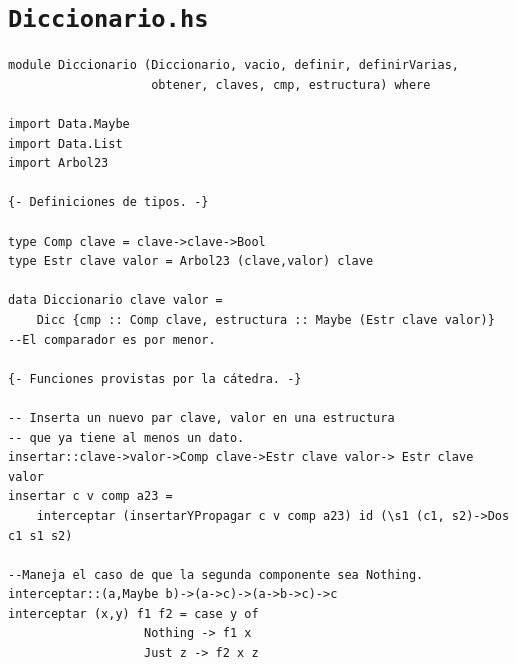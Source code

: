 \documentclass[a4paper]{article}
\begin{document}
\section{\texttt{Diccionario.hs}}
\begin{verbatim}
module Diccionario (Diccionario, vacio, definir, definirVarias,
                    obtener, claves, cmp, estructura) where

import Data.Maybe
import Data.List
import Arbol23

{- Definiciones de tipos. -}

type Comp clave = clave->clave->Bool
type Estr clave valor = Arbol23 (clave,valor) clave

data Diccionario clave valor =
    Dicc {cmp :: Comp clave, estructura :: Maybe (Estr clave valor)}
--El comparador es por menor.

{- Funciones provistas por la cátedra. -}

-- Inserta un nuevo par clave, valor en una estructura
-- que ya tiene al menos un dato.
insertar::clave->valor->Comp clave->Estr clave valor-> Estr clave valor
insertar c v comp a23 =
    interceptar (insertarYPropagar c v comp a23) id (\s1 (c1, s2)->Dos c1 s1 s2)

--Maneja el caso de que la segunda componente sea Nothing.
interceptar::(a,Maybe b)->(a->c)->(a->b->c)->c
interceptar (x,y) f1 f2 = case y of
                   Nothing -> f1 x
                   Just z -> f2 x z


\end{verbatim}
\end{document}
